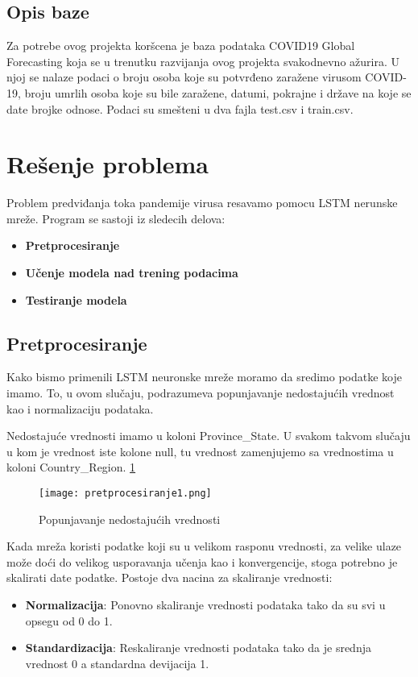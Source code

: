 \documentclass[a4paper]{article}
\begin{document}
\subsection{Opis baze}
Za potrebe ovog projekta koršcena je baza podataka COVID19 Global Forecasting koja se u trenutku razvijanja ovog projekta svakodnevno ažurira. U njoj se nalaze podaci o broju osoba koje su potvrđeno zaražene virusom COVID-19, broju umrlih osoba koje su bile zaražene, datumi, pokrajne i države na koje se date brojke odnose. Podaci su smešteni u dva fajla test.csv i train.csv.   

\section{Rešenje problema}
Problem predviđanja toka pandemije virusa resavamo pomocu LSTM nerunske mreže. Program se sastoji iz sledecih delova:
\begin{itemize}
    \item \textbf{Pretprocesiranje}
    \item \textbf{Učenje modela nad trening podacima}
    \item \textbf{Testiranje modela}
\end{itemize}


\subsection{Pretprocesiranje}
Kako bismo primenili LSTM neuronske mreže moramo da sredimo podatke koje imamo. To, u ovom slučaju, podrazumeva popunjavanje nedostajućih vrednost kao i normalizaciju podataka.


Nedostajuće vrednosti imamo u koloni Province\_State. U svakom takvom slučaju u kom je vrednost iste kolone null, tu vrednost zamenjujemo sa vrednostima u koloni Country\_Region.  \ref{fig:Pretprocesiranje1}
\begin{figure}[htp]
    \centering
    \texttt{[image: pretprocesiranje1.png]}
    \caption{Popunjavanje nedostajućih vrednosti}
    \label{fig:Pretprocesiranje1}
\end{figure}

Kada mreža koristi podatke koji su u velikom rasponu vrednosti, za velike ulaze može doći do velikog usporavanja učenja kao i konvergencije, stoga potrebno je skalirati date podatke. Postoje dva nacina za skaliranje vrednosti:

\begin{itemize}
    \item \textbf{Normalizacija}: Ponovno skaliranje vrednosti podataka tako da su svi u opsegu od 0 do 1.
    \item \textbf{Standardizacija}: Reskaliranje vrednosti podataka tako da je srednja vrednost 0 a standardna devijacija 1.
\end{itemize}
\end{document}
